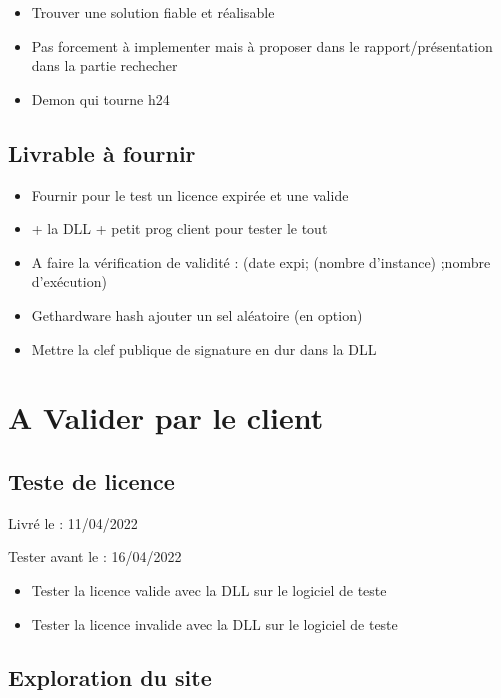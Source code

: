 \documentclass{article}
\begin{document}
\begin{itemize}
    \item Trouver une solution fiable et réalisable 
    \item Pas forcement à implementer mais à proposer dans le rapport/présentation dans la partie rechecher
    \item Demon qui tourne h24
\end{itemize}

\subsection{Livrable à fournir}

\begin{itemize}
    \item Fournir pour le test un licence expirée et une valide 
    \item + la DLL + petit prog client pour tester le tout
    \item A faire la vérification de validité : (date expi; (nombre d'instance) ;nombre d'exécution)
    \item Gethardware hash ajouter un sel aléatoire (en option)
    \item Mettre la clef publique de signature en dur dans la DLL
\end{itemize}
\newpage

\section{A Valider par le client}
\subsection{Teste de licence}

Livré le : 11/04/2022

Tester avant le : 16/04/2022\\

\begin{itemize}
     \item Tester la licence valide avec la DLL sur le logiciel de teste
     \item Tester la licence invalide avec la DLL sur le logiciel de teste
\end{itemize}

\subsection{Exploration du site}
\end{document}
